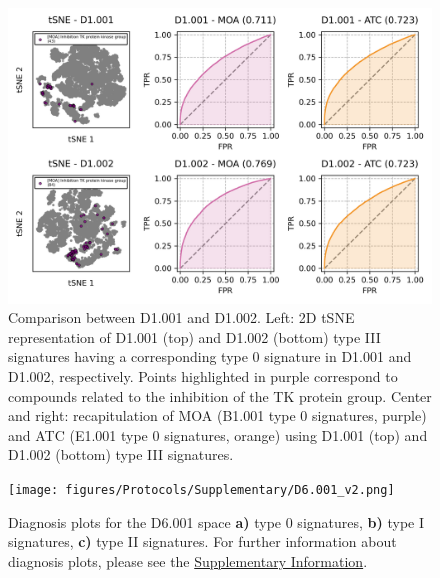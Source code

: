 \begin{figure}[htbp]
  \centering
  \includegraphics[width=1\linewidth]{figures/Protocols/Supplementary/FigS6.png}
  \caption{
    Comparison between D1.001 and D1.002. Left: 2D tSNE representation of D1.001 (top) and D1.002 (bottom) type III signatures having a corresponding type 0 signature in D1.001 and D1.002, respectively. Points highlighted in purple correspond to compounds related to the inhibition of the TK protein group.  Center and right: recapitulation of MOA (B1.001 type 0 signatures, purple) and ATC (E1.001 type 0 signatures, orange) using D1.001 (top) and D1.002 (bottom) type III signatures.  
  }
  \label{Protocols_FigS6}
\end{figure}


\begin{figure}[htbp]
  \centering
  \texttt{[image: figures/Protocols/Supplementary/D6.001\_v2.png]}
  \caption{
    Diagnosis plots for the D6.001 space
    \textbf{a)} type 0 signatures,
    \textbf{b)} type I signatures,
    \textbf{c)} type II signatures. For further information about diagnosis plots, please see the \hyperref[Supplementary_Protocols_Diagnosis]{Supplementary Information}.
  }
  \label{Protocols_FigS7}
\end{figure}


